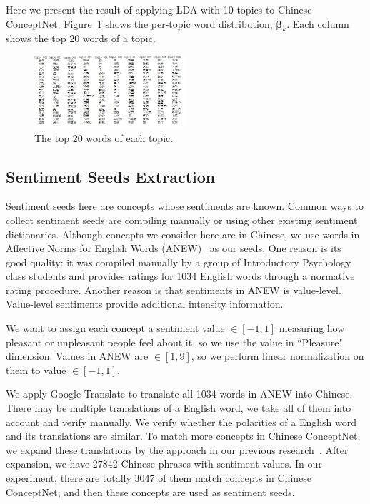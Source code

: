 Here we present the result of applying LDA with 10 topics to Chinese ConceptNet. Figure~\ref{fig:wordTop20} shows the per-topic word distribution, $\boldsymbol{\beta}_k$. Each column shows the top 20 words of a topic.

\begin{figure}[!t]
\centering
\includegraphics[width=0.5\textwidth]{fig/wordTop20.jpg}
\caption{The top 20 words of each topic.}
\label{fig:wordTop20}
\end{figure}

\subsection{Sentiment Seeds Extraction}
Sentiment seeds here are concepts whose sentiments are known. Common ways to collect sentiment seeds are compiling manually or using other existing sentiment dictionaries. Although concepts we consider here are in Chinese, we use words in Affective Norms for English Words (ANEW)~\cite{Bradley:ANEW99} as our seeds. One reason is its good quality: it was compiled manually by a group of Introductory Psychology class students and provides ratings for 1034 English words through a normative rating procedure. Another reason is that sentiments in ANEW is value-level. Value-level sentiments provide additional intensity information.

We want to assign each concept a sentiment value $\in [-1,1]$ measuring how pleasant or unpleasant people feel about it, so we use the value in ``Pleasure" dimension. Values in ANEW are $\in [1,9]$, so we perform linear normalization on them to value $\in [-1,1]$.

We apply Google Translate to translate all 1034 words in ANEW into Chinese. There may be multiple translations of a English word, we take all of them into account and verify manually. We verify whether the polarities of a English word and its translations are similar. To match more concepts in Chinese ConceptNet, we expand these translations by the approach in our previous research~\cite{Wu:TAAI11}. After expansion, we have 27842 Chinese phrases with sentiment values. In our experiment, there are totally 3047 of them match concepts in Chinese ConceptNet, and then these concepts are used as sentiment seeds.

